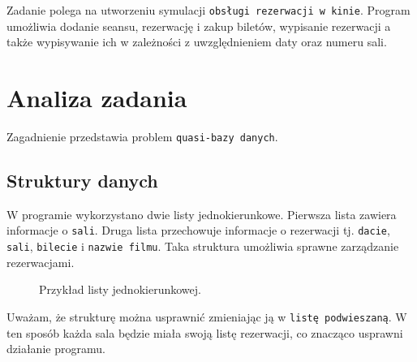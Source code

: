 \documentclass[12pt,a4paper,oneside]{article}
\let\oldmarginpar\marginpar
\renewcommand\marginpar[1]{%
  {\linespread{0.85}\normalfont\scriptsize%
\oldmarginpar[\hspace{1cm}\begin{minipage}{3cm}\raggedleft\scriptsize\color{black}\textsf{#1}\end{minipage}]%
{\hspace{0cm}\begin{minipage}{3cm}\raggedright\scriptsize\color{black}\textsf{#1}\end{minipage}}%
}%
}
\begin{document}
Zadanie polega na utworzeniu symulacji \texttt{obsługi rezerwacji w kinie}. Program umożliwia dodanie seansu, rezerwację i zakup biletów, wypisanie rezerwacji a także wypisywanie ich w zależności z uwzględnieniem daty oraz numeru sali.


\section{Analiza zadania}
\marginpar{}

Zagadnienie przedstawia problem \texttt{quasi-bazy danych}. 

\subsection{Struktury danych}
\marginpar{}
W programie wykorzystano dwie listy jednokierunkowe. Pierwsza lista zawiera informacje o \texttt{sali}. Druga lista przechowuje informacje o rezerwacji tj. \texttt{dacie}, \texttt{sali}, \texttt{bilecie} i \texttt{nazwie filmu}. Taka struktura umożliwia sprawne zarządzanie rezerwacjami. \newline

\begin{figure}[H]
\centering
{}
\indent \caption{Przykład listy jednokierunkowej.}
\label{fig:lista_jednokierunkowa}
\end{figure} 



\noindent Uważam, że strukturę można usprawnić zmieniając ją w \texttt{listę podwieszaną}. W ten sposób każda sala będzie miała swoją listę rezerwacji, co znacząco usprawni działanie programu.
\end{document}
